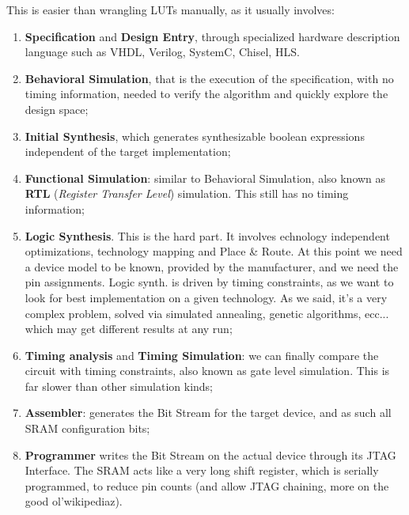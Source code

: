 \documentclass[a4paper,11pt]{article}
\begin{document}
This is easier than wrangling LUTs manually, as it usually involves:
\begin{enumerate}
	\item \textbf{Specification} and \textbf{Design Entry}, through specialized hardware description language such as VHDL, Verilog, SystemC, Chisel, HLS.
	\item \textbf{Behavioral Simulation}, that is the execution of the specification, with no timing information, needed to verify the algorithm and quickly explore the design space;
	\item \textbf{Initial Synthesis}, which generates synthesizable boolean expressions independent of the target implementation;
	\item \textbf{Functional Simulation}: similar to Behavioral Simulation, also known as \textbf{RTL} (\textit{Register Transfer Level}) simulation. This still has no timing information;
	\item \textbf{Logic Synthesis}. This is the hard part. It involves echnology independent optimizations, technology mapping and Place \& Route. At this point we need a device model to be known, provided by the manufacturer, and we need the pin assignments.
	      Logic synth. is driven by timing constraints, as we want to look for best implementation on a given technology. As we said, it's a very complex problem, solved via simulated annealing, genetic algorithms, ecc... which may get different results at any run;
	\item \textbf{Timing analysis} and \textbf{Timing Simulation}: we can finally compare the circuit with timing constraints, also known as gate level simulation. This is far slower than other simulation kinds;
	\item \textbf{Assembler}: generates the Bit Stream for the target device, and as such all SRAM configuration bits;
	\item \textbf{Programmer} writes the Bit Stream on the actual device through its JTAG Interface. The SRAM acts like a very long shift register, which is serially programmed, to reduce pin counts (and allow JTAG chaining, more on the good ol'wikipediaz).
\end{enumerate}
\end{document}
